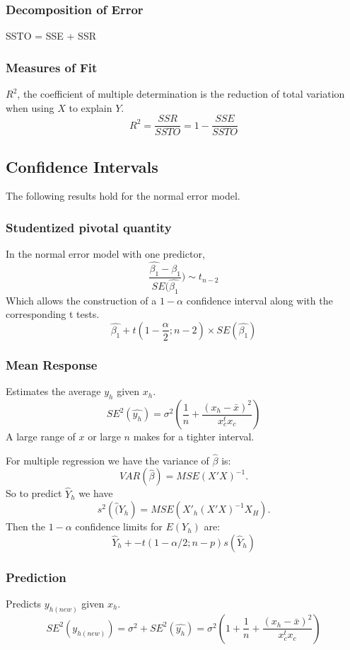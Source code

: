 \documentclass[12pt]{article}
\begin{document}
\subsubsection{Decomposition of Error}
SSTO = SSE + SSR

\subsubsection{Measures of Fit}

$R^2$, the coefficient of multiple determination is the reduction of total
variation when using $X$ to explain $Y$.
\[
    R^2 = \frac{SSR}{SSTO} = 1 - \frac{SSE}{SSTO}
\]


\subsection{Confidence Intervals}
The following results hold for the normal error model.

\subsubsection{Studentized pivotal quantity}
In the normal error model with one predictor, 
\[
    \frac{\hat{\beta_1} - \beta_1}{SE(\hat{\beta_1}}) \sim t_{n - 2}
\]
Which allows the construction of a $1 - \alpha$ confidence interval along
with the corresponding t tests.
\[
    \hat{\beta_1} + t(1 - \frac{\alpha}{2}; n - 2) \times
    SE(\hat{\beta_1})
\]

\subsubsection{Mean Response}
Estimates the average $y_h$ given $x_h$. 
\[
    SE^2(\hat{y_h}) = \sigma^2 (\frac{1}{n} + \frac{(x_h - \bar{x})^2}{x_c^t
x_c})
\]
A large range of $x$ or large $n$ makes for a tighter interval.

For multiple regression we have the variance of $\hat\beta$ is:
\[
    VAR(\hat\beta) = MSE (X'X)^{-1}.
\]
So to predict $\hat Y_h$ we have
\[
    s^2(\hat (Y_h) = MSE (X'_h (X'X)^{-1} X_H) .
\]
Then the $1 - \alpha$ confidence limits for $E(Y_h)$ are:
\[
    \hat Y_h +- t(1 - \alpha / 2; n - p) s(\hat Y _h)
\]

\subsubsection{Prediction}
Predicts $y_{h(new)}$ given $x_h$. 
\[
    SE^2(y_{h(new)}) = \sigma^2 + SE^2(\hat{y_h})
    = \sigma^2 ( 1 + \frac{1}{n} + \frac{(x_h - \bar{x})^2}{x_c^t x_c})
\]
\end{document}
